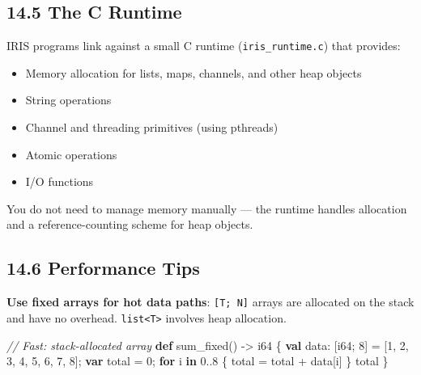 \documentclass[
  english,
]{book}
\newenvironment{Shaded}{\begin{snugshade}}{\end{snugshade}}
\newcommand{\CommentTok}[1]{\textcolor[rgb]{0.42,0.60,0.33}{\textit{#1}}}
\newcommand{\ControlFlowTok}[1]{\textcolor[rgb]{0.77,0.53,0.75}{\textbf{#1}}}
\newcommand{\DataTypeTok}[1]{\textcolor[rgb]{0.31,0.79,0.69}{#1}}
\newcommand{\DecValTok}[1]{\textcolor[rgb]{0.71,0.81,0.66}{#1}}
\newcommand{\KeywordTok}[1]{\textcolor[rgb]{0.34,0.61,0.84}{\textbf{#1}}}
\newcommand{\NormalTok}[1]{\textcolor[rgb]{0.83,0.83,0.83}{#1}}
\newcommand{\OperatorTok}[1]{\textcolor[rgb]{0.83,0.83,0.83}{#1}}
\providecommand{\tightlist}{%
  \setlength{\itemsep}{0pt}\setlength{\parskip}{0pt}}
\begin{document}
\subsection{14.5 The C Runtime}\label{the-c-runtime}

IRIS programs link against a small C runtime (\texttt{iris\_runtime.c})
that provides:

\begin{itemize}
\tightlist
\item
  Memory allocation for lists, maps, channels, and other heap objects
\item
  String operations
\item
  Channel and threading primitives (using pthreads)
\item
  Atomic operations
\item
  I/O functions
\end{itemize}

You do not need to manage memory manually --- the runtime handles
allocation and a reference-counting scheme for heap objects.

\subsection{14.6 Performance Tips}\label{performance-tips}

\textbf{Use fixed arrays for hot data paths}: \texttt{{[}T;\ N{]}}
arrays are allocated on the stack and have no overhead.
\texttt{list\textless{}T\textgreater{}} involves heap allocation.

\begin{Shaded}
\begin{Highlighting}[]
\CommentTok{// Fast: stack{-}allocated array}
\KeywordTok{def}\NormalTok{ sum\_fixed() }\OperatorTok{{-}\textgreater{}} \DataTypeTok{i64}\NormalTok{ \{}
    \KeywordTok{val}\NormalTok{ data: [}\DataTypeTok{i64}\NormalTok{; }\DecValTok{8}\NormalTok{] }\OperatorTok{=}\NormalTok{ [}\DecValTok{1}\NormalTok{, }\DecValTok{2}\NormalTok{, }\DecValTok{3}\NormalTok{, }\DecValTok{4}\NormalTok{, }\DecValTok{5}\NormalTok{, }\DecValTok{6}\NormalTok{, }\DecValTok{7}\NormalTok{, }\DecValTok{8}\NormalTok{];}
    \KeywordTok{var}\NormalTok{ total }\OperatorTok{=} \DecValTok{0}\NormalTok{;}
    \ControlFlowTok{for}\NormalTok{ i }\ControlFlowTok{in} \DecValTok{0}\OperatorTok{..}\DecValTok{8}\NormalTok{ \{}
\NormalTok{        total }\OperatorTok{=}\NormalTok{ total }\OperatorTok{+}\NormalTok{ data[i]}
\NormalTok{    \}}
\NormalTok{    total}
\NormalTok{\}}
\end{Highlighting}
\end{Shaded}
\end{document}
